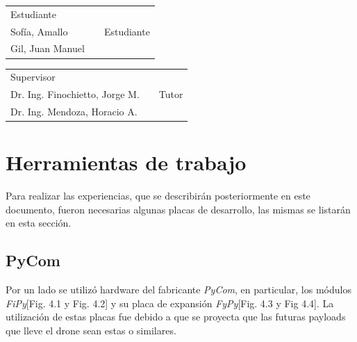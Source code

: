 \documentclass[12pt]{article}
\begin{document}
\vspace{1.5cm}
\begin{tabular}{p{5.5cm}cp{5.5cm}}
  \cline{1-1} \cline{3-3} \\
  \centering Estudiante   \\ Sofía, Amallo && \centering Estudiante \\ Gil, Juan Manuel
\end{tabular}

\vspace{1.5cm}

\begin{tabular}{p{5.5cm}cp{5.5cm}}
  \cline{1-1} \cline{3-3} \\
  \centering Supervisor   \\ Dr. Ing. Finochietto, Jorge M. && \centering Tutor \\ Dr. Ing. Mendoza, Horacio A.
\end{tabular}


\newpage
\section{Herramientas de trabajo}
\justifying
Para realizar las experiencias, que se describirán posteriormente en este documento, fueron necesarias algunas placas de desarrollo, las mismas se listarán en esta sección.
\subsection{PyCom}
Por un lado se utilizó hardware del fabricante \textit{PyCom}, en particular, los módulos \textit{FiPy}[Fig. 4.1 y Fig. 4.2] y su placa de expansión \textit{FyPy}[Fig. 4.3 y Fig 4.4]. La utilización de estas placas fue debido a que se proyecta que las futuras payloads que lleve el drone sean estas o similares.
\end{document}
